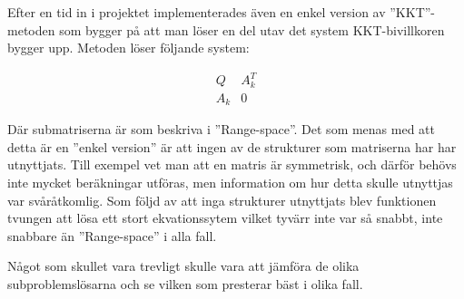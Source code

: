 Efter en tid in i projektet implementerades även en enkel version av ''KKT''-metoden som bygger på att man löser en del utav det system KKT-bivillkoren bygger upp. Metoden löser följande system:

$$
\begin{matrix}
  Q   & A_k^T \\
  A_k & 0
\end{matrix}
$$

Där submatriserna är som beskriva i ''Range-space''. Det som menas med att detta är en ''enkel version'' är att ingen av de strukturer som matriserna har har utnyttjats. Till exempel vet man att en matris är symmetrisk, och därför behövs inte mycket beräkningar utföras, men information om hur detta skulle utnyttjas var svåråtkomlig. Som följd av att inga strukturer utnyttjats blev funktionen tvungen att lösa ett stort ekvationssytem vilket tyvärr inte var så snabbt, inte snabbare än ''Range-space'' i alla fall.


Något som skullet vara trevligt skulle vara att jämföra de olika subproblemslösarna och se vilken som presterar bäst i olika fall.